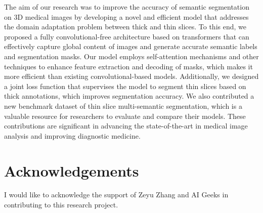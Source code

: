 \documentclass{article}
\begin{document}
The aim of our research was to improve the accuracy of semantic segmentation on 3D medical images by developing a novel and efficient model that addresses the domain adaptation problem between thick and thin slices. To this end, we proposed a fully convolutional-free architecture based on transformers that can effectively capture global content of images and generate accurate semantic labels and segmentation masks. Our model employs self-attention mechanisms and other techniques to enhance feature extraction and decoding of masks, which makes it more efficient than existing convolutional-based models. Additionally, we designed a joint loss function that supervises the model to segment thin slices based on thick annotations, which improves segmentation accuracy. We also contributed a new benchmark dataset of thin slice multi-semantic segmentation, which is a valuable resource for researchers to evaluate and compare their models. These contributions are significant in advancing the state-of-the-art in medical image analysis and improving diagnostic medicine.

\section{Acknowledgements}
I would like to acknowledge the support of Zeyu Zhang and AI Geeks in contributing to this research project.

% 
% 


\end{document}
